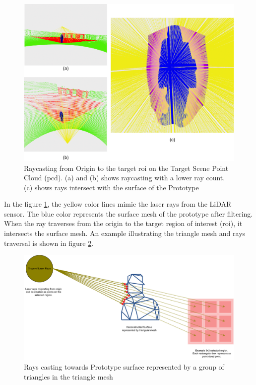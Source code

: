 \begin{figure}[htbp]
    \centering
    \includegraphics[width=1\linewidth]{97_graphics/results/raycasting_from_origin.pdf}
    \caption{Raycasting from Origin to the target \acrshort{roi} on the Target Scene Point Cloud (\acrshort{pcd}). (a) and (b) shows raycasting with a lower ray count. (c) shows rays intersect with the surface of the Prototype}
    \label{fig:result-raycasting_from_origin}
\end{figure}

In the figure \ref{fig:result-raycasting_from_origin}, the yellow color lines mimic the laser rays from the LiDAR sensor. The blue color represents the surface mesh of the prototype after filtering. When the ray traverses from the origin to the target region of interest (\acrshort{roi}), it intersects the surface mesh. An example illustrating the triangle mesh and rays traversal is shown in figure \ref{fig:result-raycasting_with_triangles}.

\begin{figure}[htbp]
    \centering
    \begin{minipage}[b]{0.8\textwidth}
    \centering
    \includegraphics[width=1\linewidth]{97_graphics/results/raycasting_with_trianglesmeshes.pdf}
    \caption{Rays casting towards Prototype surface represented by a group of triangles in the triangle mesh}
    \label{fig:result-raycasting_with_triangles}
    \end{minipage}
\end{figure}

